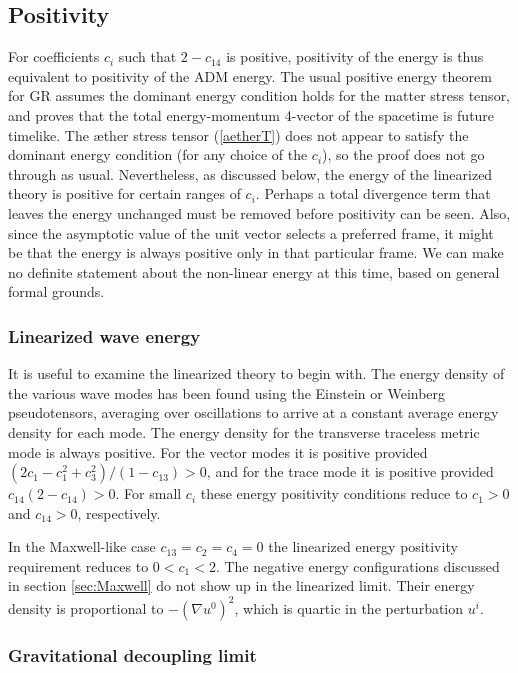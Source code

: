 \documentclass[aps]{ws-procs9x6}
\begin{document}
\subsection{Positivity}

For coefficients $c_i$ such that $2 - c_{14}$ is positive,
positivity of the energy is thus equivalent to positivity of the
ADM energy. The usual positive energy theorem\cite{Witten} for GR
assumes the dominant energy condition holds for the matter stress
tensor, and proves that the total energy-momentum 4-vector of the
spacetime is future timelike. The {\ae}ther stress tensor
(\ref{aetherT}) does not appear to satisfy the dominant energy
condition (for any choice of the $c_i$), so the proof does not go
through as usual. Nevertheless, as discussed below, the energy of
the linearized theory is positive for certain ranges of $c_i$.
Perhaps a total divergence term that leaves the energy unchanged
must be removed before positivity can be seen. Also, since the
asymptotic value of the unit vector selects a preferred frame, it
might be that the energy is always positive only in that
particular frame. We can make no definite statement about the
non-linear energy at this time, based on general formal grounds.

\subsubsection{Linearized wave energy}
It is useful to examine the linearized theory to begin with. The
energy density of the various wave modes has been
found\cite{ElingJ2} using the Einstein or Weinberg pseudotensors,
averaging over oscillations to arrive at a constant average
energy density for each mode. The energy density for the
transverse traceless metric mode is always positive. For the
vector modes it is positive provided $(2c_1
-c_1^2+c_3^2)/(1-c_{13})>0$, and for the trace mode it is
positive provided $c_{14}(2-c_{14})>0$.  For small $c_i$ these
energy positivity conditions reduce to $c_1>0$ and $c_{14}>0$,
respectively.

In the Maxwell-like case $c_{13}=c_2=c_4=0$ the linearized energy
positivity requirement reduces to $0< c_1 < 2$. The negative
energy configurations discussed in section \ref{sec:Maxwell} do
not show up in the linearized limit.  Their energy density is
proportional to $-(\nabla u^0)^2$, which is quartic in the
perturbation $u^i$.

\subsubsection{Gravitational decoupling limit}
\label{decoupling}
\end{document}
